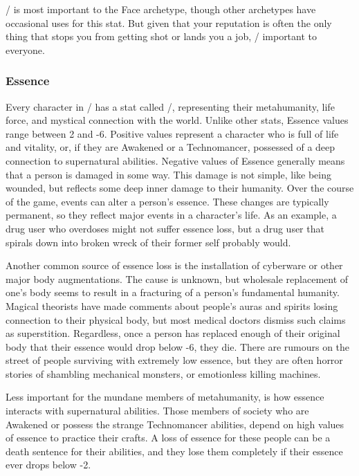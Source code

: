 \documentclass[oneside,10pt]{article}
\begin{document}
\begin{multicols}{2}
\flair/ is most important to the Face archetype, though other
archetypes have occasional uses for this stat. But given that your
reputation is often the only thing that stops you from getting shot or
lands you a job, \flair/ important to everyone.

\subsubsection{Essence}
\label{stat_essence}

Every character in \SW/  has a stat called \essence/,
representing their metahumanity, life force, and mystical connection
with the world. Unlike other stats, Essence values range between 2 and
-6. Positive values represent a character who is full of life and
vitality, or, if they are Awakened or a Technomancer, possessed of a
deep connection to supernatural abilities. Negative values of Essence
generally means that a person is damaged in some way. This damage is
not simple, like being wounded, but reflects some deep inner damage to
their humanity. Over the course of the game, events can alter a
person's essence. These changes are typically permanent, so they
reflect major events in a character's life. As an example, a drug user
who overdoses might not suffer essence loss, but a drug user that
spirals down into broken wreck of their former self probably would.

Another common source of essence loss is the installation of cyberware
or other major body augmentations. The cause is unknown, but wholesale
replacement of one's body seems to result in a fracturing of a
person's fundamental humanity. Magical theorists have made comments
about people's auras and spirits losing connection to their physical
body, but most medical doctors dismiss such claims as
superstition. Regardless, once a person has replaced enough of their
original body that their essence would drop below -6, they die. There
are rumours on the street of people surviving with extremely low
essence, but they are often horror stories of shambling mechanical
monsters, or emotionless killing machines.

Less important for the mundane members of metahumanity, is how essence
interacts with supernatural abilities. Those members of society who
are Awakened or possess the strange Technomancer abilities, depend on
high values of essence to practice their crafts. A loss of essence for
these people can be a death sentence for their abilities, and they
lose them completely if their essence ever drops below -2.


\end{multicols}
\end{document}
